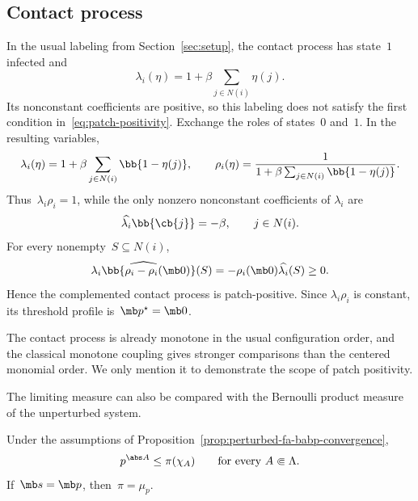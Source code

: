 \subsection{Contact process}
\label{subsec:contact-process-applications}

In the usual labeling from Section~\ref{sec:setup}, the contact process has
state~$1$ infected and
\begin{equation*}
\lambda_i(\eta)
=
1+\beta\sum_{j\in N(i)}\eta(j).
\end{equation*}
Its nonconstant coefficients are positive, so this labeling does not satisfy
the first condition in~\eqref{eq:patch-positivity}. Exchange the roles of
states~$0$ and~$1$. In the resulting variables,
\begin{equation*}
\lambda_i(\eta)
=
1+\beta\sum_{j\in N(i)}\bb{1-\eta(j)},
\qquad
\rho_i(\eta)
=
\frac{1}{1+\beta\sum_{j\in N(i)}\bb{1-\eta(j)}}.
\end{equation*}
Thus~$\lambda_i\rho_i=1$, while the only nonzero nonconstant coefficients of
$\lambda_i$ are
\begin{equation*}
\widehat{\lambda_i}\bb{\cb{j}}=-\beta,
\qquad j\in N(i).
\end{equation*}
For every nonempty~$S\subseteq N(i)$,
\begin{equation*}
\widehat{\lambda_i\bb{\rho_i-\rho_i(\mb0)}}(S)
=
-\rho_i(\mb0)\widehat{\lambda_i}(S)
\geq0.
\end{equation*}
Hence the complemented contact process is patch-positive. Since
$\lambda_i\rho_i$ is constant, its threshold profile is~$\mb p^\star=\mb0$.

The contact process is already monotone in the usual configuration order, and
the classical monotone coupling gives stronger comparisons than the centered
monomial order. We only mention it to demonstrate the scope of patch
positivity.


The limiting measure can also be compared with the Bernoulli product measure
of the unperturbed system.

\begin{corollary}
\label{cor:perturbed-fa-babp-comparison}
Under the assumptions of
Proposition~\ref{prop:perturbed-fa-babp-convergence},
\begin{equation}
\label{eq:perturbed-fa-babp-stationary-comparison}
p^{\abs A}
\leq
\pi(\chi_A)
\qquad
\text{for every }A\Subset\Lambda.
\end{equation}
If~$\mb s=\mb p$, then~$\pi=\mu_p$.
\end{corollary}

